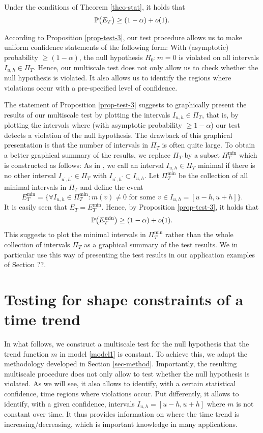 \begin{prop}\label{prop-test-3}
Under the conditions of Theorem \ref{theo-stat}, it holds that  
\[ \mathbb{P} \big( E_T \big) \ge (1-\alpha) + o(1). \] 
\end{prop}
According to Proposition \ref{prop-test-3}, our test procedure allows us to make uniform confidence statements of the following form: With (asymptotic) probability $\ge (1-\alpha)$, the null hypothesis $H_0: m = 0$ is violated on all intervals $I_{u,h} \in \Pi_T$. Hence, our multiscale test does not only allow us to check whether the null hypothesis is violated. It also allows us to identify the regions where violations occur with a pre-specified level of confidence. 
 

The statement of Proposition \ref{prop-test-3} suggests to graphically present the results of our multiscale test by plotting the intervals $I_{u,h} \in \Pi_T$, that is, by plotting the intervals where (with asymptotic probability $\ge 1-\alpha$) our test detects a violation of the null hypothesis. The drawback of this graphical presentation is that the number of intervals in $\Pi_T$ is often quite large. To obtain a better graphical summary of the results, we replace $\Pi_T$ by a subset $\Pi_T^{\min}$ which is constructed as follows: As in \cite{Duembgen2002}, we call an interval $I_{u,h} \in \Pi_T$ minimal if there is no other interval $I_{u^\prime,h^\prime} \in \Pi_T$ with $I_{u^\prime,h^\prime} \subset I_{u,h}$. Let $\Pi_T^{\min}$ be the collection of all minimal intervals in $\Pi_T$ and define the event 
\[ E_T^{\min} = \Big\{ \forall I_{u,h} \in \Pi_T^{\min}: m(v) \ne 0 \text{ for some } v \in I_{u,h} = [u-h,u+h] \Big\}. \]
It is easily seen that $E_T = E_T^{\min}$. Hence, by Proposition \ref{prop-test-3}, it holds that
\[ \mathbb{P} \big( E_T^{\min} \big) \ge (1-\alpha) + o(1). \] 
This suggests to plot the minimal intervals in $\Pi_T^{\min}$ rather than the whole collection of intervals $\Pi_T$ as a graphical summary of the test results. We in particular use this way of presenting the test results in our application examples of Section ??. 



\section{Testing for shape constraints of a time trend}\label{sec-test-shape}


In what follows, we construct a multiscale test for the null hypothesis that the trend function $m$ in model \eqref{model1} is constant. To achieve this, we adapt the methodology developed in Section \ref{sec-method}. Importantly, the resulting multiscale procedure does not only allow to test whether the null hypothesis is violated. As we will see, it also allows to identify, with a certain statistical confidence, time regions where violations occur. Put differently, it allows to identify, with a given confidence, intervals $I_{u,h} = [u-h,u+h]$ where $m$ is not constant over time.
It thus provides information on where the time trend is increasing/decreasing, which is important knowledge in many applications. 


